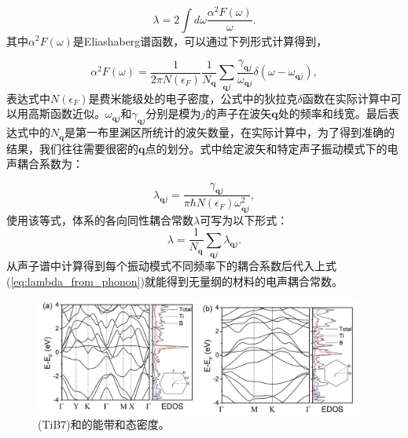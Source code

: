 \begin{equation}\label{eq:lambda_coupling}
  \lambda = 2 \int d\omega \frac{\alpha^2 F(\omega)}{\omega}.
\end{equation}
其中$\alpha^2 F(\omega)$是Eliashaberg谱函数，可以通过下列形式计算得到，

\begin{equation}\label{eq:elishaberg_calc}
  \alpha^2 F(\omega) = \frac{1}{2\pi N(\epsilon_F)}\frac{1}{N_{\bm{q}}}
  \sum_{\bm{q}j} \frac{\gamma_{\bm{q}j}}{\omega_{\bm{q}j}}
  \delta(\omega-\omega_{\bm{q}j}),
\end{equation}
表达式中$N(\epsilon_F)$是费米能级处的电子密度，公式中的狄拉克$\delta$函数在实际计算中可以用高斯函数近似。$\omega_{\bm{q}j}$和$\gamma_{\bm{q}j}$分别是模为$j$的声子在波矢$\bm{q}$处的频率和线宽。最后表达式中的$N_{\bm{q}}$是第一布里渊区所统计的波矢数量，在实际计算中，为了得到准确的结果，我们往往需要很密的$\bm{q}$点的划分。式中给定波矢和特定声子振动模式下的电声耦合系数为：

\begin{equation}
  \lambda_{\bm{q}j} =
  \frac{\gamma_{\bm{q}j}}{\pi \hbar N(\epsilon_F) \omega^2_{\bm{q}j}},
\end{equation}
使用该等式，体系的各向同性耦合常数$\lambda$可写为以下形式：
\begin{equation}\label{eq:lambda_from_phonon}
  \lambda = \frac{1}{N_{\bm{q}}}\sum_{\bm{q}j} \lambda_{\bm{q}j}.
\end{equation}
从声子谱中计算得到每个振动模式不同频率下的耦合系数后代入上式(\ref{eq:lambda_from_phonon})就能得到无量纲的材料的电声耦合常数。

\begin{figure}
  \includegraphics[width=0.96\textwidth]{figs/ch5_bands.png}
  \centering
  \caption{\ce(TiB7)和的能带和态密度。}
  \label{fig:ch5_bands}
\end{figure}

